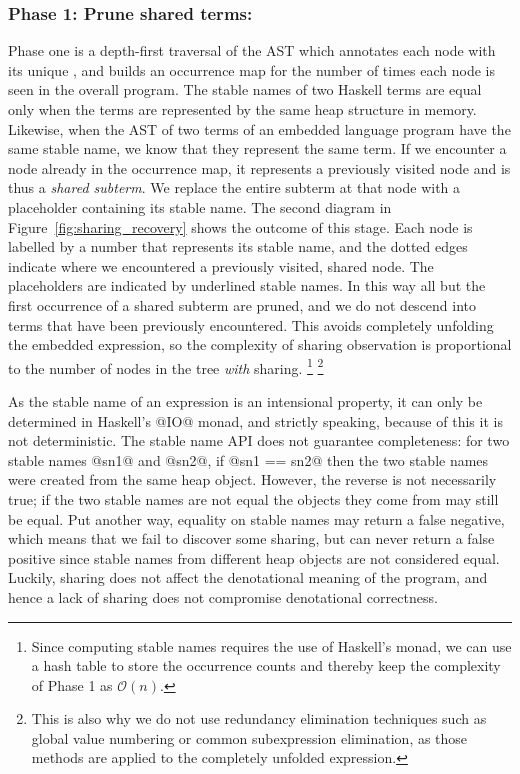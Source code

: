 \subsubsection*{Phase 1: Prune shared terms:}

Phase one is a depth-first traversal of the AST which annotates each node with
its unique , and builds an occurrence map for the number of
times each node is seen in the overall program. The stable names of two Haskell
terms are equal only when the terms are represented by the same heap structure
in memory. Likewise, when the AST of two terms of an embedded language program
have the same stable name, we know that they represent the same term. If we
encounter a node already in the occurrence map, it represents a previously
visited node and is thus a \emph{shared subterm}. We replace the entire subterm
at that node with a placeholder containing its stable name. The second diagram
in Figure~\ref{fig:sharing_recovery} shows the outcome of this stage. Each node
is labelled by a number that represents its stable name, and the dotted edges
indicate where we encountered a previously visited, shared node. The
placeholders are indicated by underlined stable names. In this way all but the
first occurrence of a shared subterm are pruned,
and we do not descend into terms that have been previously encountered. This
avoids completely unfolding the embedded expression, so the complexity of
sharing observation is proportional to the number of nodes in the tree
\emph{with} sharing.%
\footnote{Since computing stable names requires the use of Haskell's
 monad, we can use a hash table to store the occurrence counts and
thereby keep the complexity of Phase 1 as
$\mathcal{O}\left(n\right)$.}%
\footnote{This is also why we do not use redundancy elimination techniques such
as global value numbering or common subexpression elimination, as those methods
are applied to the completely unfolded expression.}

As the stable name of an expression is an intensional property, it can only be
determined in Haskell's @IO@ monad, and strictly speaking, because of this
it is not deterministic. The stable name API does not guarantee completeness:
for two stable names @sn1@ and @sn2@, if @sn1 == sn2@ then the
two stable names were created from the same heap object. However, the reverse is
not necessarily true; if the two stable names are not equal the objects they
come from may still be equal. Put another way, equality on stable names may
return a false negative, which means that we fail to discover some sharing, but
can never return a false positive since stable names from different heap objects
are not considered equal. Luckily, sharing does not affect the denotational
meaning of the program, and hence a lack of sharing does not compromise
denotational correctness.



